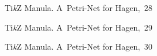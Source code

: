 \documentclass[a4paper,11pt]{article}
\begin{document}
\begin{figure}[ht]

  \centering

  \begin{tikzpicture}



  \end{tikzpicture}

  \caption{Ti\emph{k}Z Manula. A~Petri-Net for Hagen,~28}

\end{figure}





\begin{figure}[ht]

  \centering

  \begin{tikzpicture}



  \end{tikzpicture}

  \caption{Ti\emph{k}Z Manula. A~Petri-Net for Hagen,~29}

\end{figure}





\begin{figure}[ht]

  \centering

  \begin{tikzpicture}



  \end{tikzpicture}

  \caption{Ti\emph{k}Z Manula. A~Petri-Net for Hagen,~30}

\end{figure}











\end{document}
